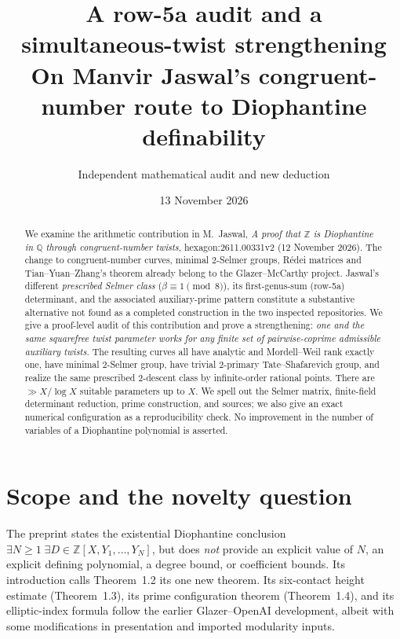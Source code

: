 \documentclass[11pt,a4paper]{article}
\title{A row-5a audit and a simultaneous-twist strengthening\\
\large On Manvir Jaswal's congruent-number route to Diophantine definability}
\author{Independent mathematical audit and new deduction}
\date{13 November 2026}
\theoremstyle{definition}
\newcommand{\QQ}{\mathbb Q}
\newcommand{\ZZ}{\mathbb Z}
\begin{document}
\maketitle

\begin{abstract}
We examine the arithmetic contribution in M.~Jaswal,
\emph{A proof that $\ZZ$ is Diophantine in $\QQ$ through congruent-number twists},
hexagon:2611.00331v2 (12 November 2026).  The change to congruent-number curves,
minimal $2$-Selmer groups, R\'edei matrices and Tian--Yuan--Zhang's theorem already
belong to the Glazer--McCarthy project.  Jaswal's different \emph{prescribed
Selmer class} ($\beta\equiv1\pmod8$), its first-genus-sum (row-5a) determinant,
and the associated auxiliary-prime pattern constitute a substantive alternative
not found as a completed construction in the two inspected repositories.
We give a proof-level audit of this contribution and prove a strengthening:
\emph{one and the same squarefree twist parameter works for any finite set of
pairwise-coprime admissible auxiliary twists}.  The resulting curves all have
analytic and Mordell--Weil rank exactly one, have minimal $2$-Selmer group,
have trivial $2$-primary Tate--Shafarevich group, and realize the same
prescribed $2$-descent class by infinite-order rational points.  There are
$\gg X/\log X$ suitable parameters up to $X$.  We spell out the Selmer
matrix, finite-field determinant reduction, prime construction, and sources;
we also give an exact numerical configuration as a reproducibility check.
No improvement in the number of variables of a Diophantine polynomial is
asserted.
\end{abstract}

\section{Scope and the novelty question}\label{sec:scope}

The preprint \cite{Jaswal} states the existential Diophantine conclusion
\(\exists N\ge1\;\exists D\in\ZZ[X,Y_1,\dots,Y_N]\), but does \emph{not}
provide an explicit value of $N$, an explicit defining polynomial, a degree
bound, or coefficient bounds.  Its introduction calls Theorem~1.2 its one
new theorem.  Its six-contact height estimate (Theorem~1.3), its prime
configuration theorem (Theorem~1.4), and its elliptic-index formula follow
the earlier Glazer--OpenAI development, albeit with some modifications in
presentation and imported modularity inputs.
\end{document}
